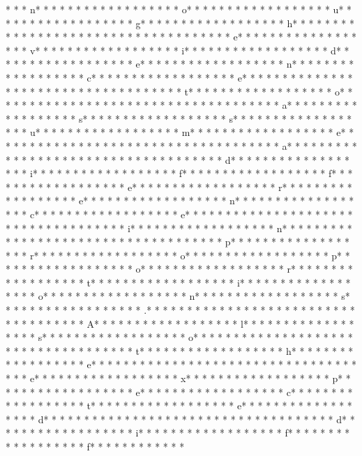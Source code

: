 * *  * n* * *  * * *  * * *  *  * * *  *  * * *  * o* * *  * * *  * * *  *  * * *  *  * * *  * u* * *  * * *  * * *  *  * * *  *  * * *  * g* * *  * * *  * * *  *  * * *  *  * * *  * h* * *  * * *  * * *  *  * * *  *  * * *  *  * * *  * * *  * * *  *  * * *  *  * * *  * e* * *  * * *  * * *  *  * * *  *  * * *  * v* * *  * * *  * * *  *  * * *  *  * * *  * i* * *  * * *  * * *  *  * * *  *  * * *  * d* * *  * * *  * * *  *  * * *  *  * * *  * e* * *  * * *  * * *  *  * * *  *  * * *  * n* * *  * * *  * * *  *  * * *  *  * * *  * c* * *  * * *  * * *  *  * * *  *  * * *  * e* * *  * * *  * * *  *  * * *  *  * * *  *  * * *  * * *  * * *  *  * * *  *  * * *  * t* * *  * * *  * * *  *  * * *  *  * * *  * o* * *  * * *  * * *  *  * * *  *  * * *  *  * * *  * * *  * * *  *  * * *  *  * * *  * a* * *  * * *  * * *  *  * * *  *  * * *  * s* * *  * * *  * * *  *  * * *  *  * * *  * s* * *  * * *  * * *  *  * * *  *  * * *  * u* * *  * * *  * * *  *  * * *  *  * * *  * m* * *  * * *  * * *  *  * * *  *  * * *  * e* * *  * * *  * * *  *  * * *  *  * * *  *  * * *  * * *  * * *  *  * * *  *  * * *  * a* * *  * * *  * * *  *  * * *  *  * * *  *  * * *  * * *  * * *  *  * * *  *  * * *  * d* * *  * * *  * * *  *  * * *  *  * * *  * i* * *  * * *  * * *  *  * * *  *  * * *  * f* * *  * * *  * * *  *  * * *  *  * * *  * f* * *  * * *  * * *  *  * * *  *  * * *  * e* * *  * * *  * * *  *  * * *  *  * * *  * r* * *  * * *  * * *  *  * * *  *  * * *  * e* * *  * * *  * * *  *  * * *  *  * * *  * n* * *  * * *  * * *  *  * * *  *  * * *  * c* * *  * * *  * * *  *  * * *  *  * * *  * e* * *  * * *  * * *  *  * * *  *  * * *  *  * * *  * * *  * * *  *  * * *  *  * * *  * i* * *  * * *  * * *  *  * * *  *  * * *  * n* * *  * * *  * * *  *  * * *  *  * * *  *  * * *  * * *  * * *  *  * * *  *  * * *  * p* * *  * * *  * * *  *  * * *  *  * * *  * r* * *  * * *  * * *  *  * * *  *  * * *  * o* * *  * * *  * * *  *  * * *  *  * * *  * p* * *  * * *  * * *  *  * * *  *  * * *  * o* * *  * * *  * * *  *  * * *  *  * * *  * r* * *  * * *  * * *  *  * * *  *  * * *  * t* * *  * * *  * * *  *  * * *  *  * * *  * i* * *  * * *  * * *  *  * * *  *  * * *  * o* * *  * * *  * * *  *  * * *  *  * * *  * n* * *  * * *  * * *  *  * * *  *  * * *  * s* * *  * * *  * * *  *  * * *  *  * * *  * .* * *  * * *  * * *  *  * * *  *  * * *  *  * * *  * * *  * * *  *  * * *  *  * * *  * A* * *  * * *  * * *  *  * * *  *  * * *  * l* * *  * * *  * * *  *  * * *  *  * * *  * s* * *  * * *  * * *  *  * * *  *  * * *  * o* * *  * * *  * * *  *  * * *  *  * * *  *  * * *  * * *  * * *  *  * * *  *  * * *  * t* * *  * * *  * * *  *  * * *  *  * * *  * h* * *  * * *  * * *  *  * * *  *  * * *  * e* * *  * * *  * * *  *  * * *  *  * * *  *  * * *  * * *  * * *  *  * * *  *  * * *  * e* * *  * * *  * * *  *  * * *  *  * * *  * x* * *  * * *  * * *  *  * * *  *  * * *  * p* * *  * * *  * * *  *  * * *  *  * * *  * e* * *  * * *  * * *  *  * * *  *  * * *  * c* * *  * * *  * * *  *  * * *  *  * * *  * t* * *  * * *  * * *  *  * * *  *  * * *  * e* * *  * * *  * * *  *  * * *  *  * * *  * d* * *  * * *  * * *  *  * * *  *  * * *  *  * * *  * * *  * * *  *  * * *  *  * * *  * d* * *  * * *  * * *  *  * * *  *  * * *  * i* * *  * * *  * * *  *  * * *  *  * * *  * f* * *  * * *  * * *  *  * * *  *  * * *  * f* * *  * * *  * * *  *  * * 
